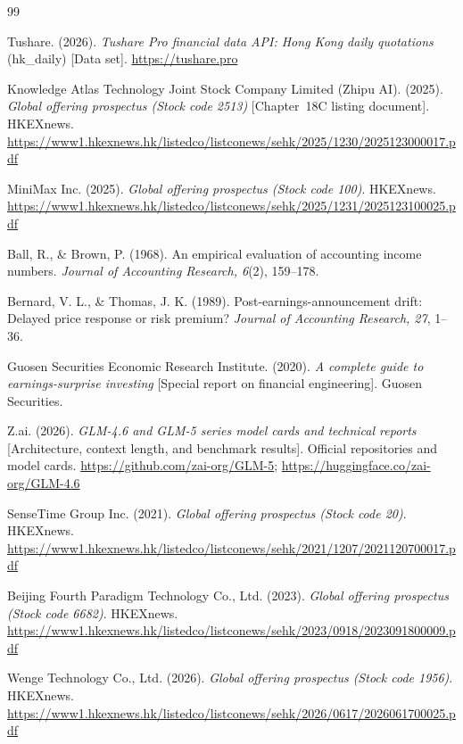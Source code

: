 \documentclass[11pt]{article}
\begin{document}
\clearpage
\begin{thebibliography}{99}

Tushare. (2026). \emph{Tushare Pro financial data API: Hong Kong daily quotations} (hk\_daily) [Data set].
\url{https://tushare.pro}

Knowledge Atlas Technology Joint Stock Company Limited (Zhipu AI). (2025). \emph{Global offering prospectus
(Stock code 2513)} [Chapter~18C listing document]. HKEXnews.
\url{https://www1.hkexnews.hk/listedco/listconews/sehk/2025/1230/2025123000017.pdf}

MiniMax Inc. (2025). \emph{Global offering prospectus (Stock code 100)}. HKEXnews.
\url{https://www1.hkexnews.hk/listedco/listconews/sehk/2025/1231/2025123100025.pdf}

Ball, R., \& Brown, P. (1968). An empirical evaluation of accounting income numbers. \emph{Journal of
Accounting Research, 6}(2), 159--178.

Bernard, V. L., \& Thomas, J. K. (1989). Post-earnings-announcement drift: Delayed price response or risk
premium? \emph{Journal of Accounting Research, 27}, 1--36.

Guosen Securities Economic Research Institute. (2020). \emph{A complete guide to earnings-surprise investing}
[Special report on financial engineering]. Guosen Securities.

Z.ai. (2026). \emph{GLM-4.6 and GLM-5 series model cards and technical reports} [Architecture, context
length, and benchmark results]. Official repositories and model cards.
\url{https://github.com/zai-org/GLM-5}; \url{https://huggingface.co/zai-org/GLM-4.6}

SenseTime Group Inc. (2021). \emph{Global offering prospectus (Stock code 20)}. HKEXnews.
\url{https://www1.hkexnews.hk/listedco/listconews/sehk/2021/1207/2021120700017.pdf}

Beijing Fourth Paradigm Technology Co., Ltd. (2023). \emph{Global offering prospectus (Stock code 6682)}.
HKEXnews.
\url{https://www1.hkexnews.hk/listedco/listconews/sehk/2023/0918/2023091800009.pdf}

Wenge Technology Co., Ltd. (2026). \emph{Global offering prospectus (Stock code 1956)}.
HKEXnews.
\url{https://www1.hkexnews.hk/listedco/listconews/sehk/2026/0617/2026061700025.pdf}


\end{thebibliography}
\end{document}
